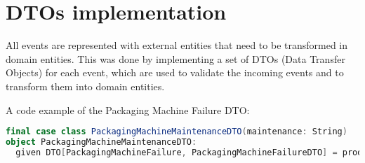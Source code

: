 \section{DTOs implementation}
All events are represented with external entities that need to be transformed in domain entities.
This was done by implementing a set of DTOs (Data Transfer Objects) for each event, which are used to validate the incoming events and to transform them into domain entities.

A code example of the Packaging Machine Failure DTO:

\begin{lstlisting}[language=Scala]
    final case class PackagingMachineMaintenanceDTO(maintenance: String)
object PackagingMachineMaintenanceDTO:
  given DTO[PackagingMachineFailure, PackagingMachineFailureDTO] = productTypeDTO

\end{lstlisting}